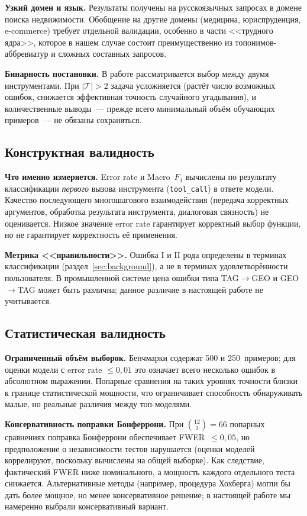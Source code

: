 \textbf{Узкий домен и язык.} Результаты получены на русскоязычных запросах в домене поиска недвижимости. Обобщение на другие домены (медицина, юриспруденция, e-commerce) требует отдельной валидации, особенно в части <<трудного ядра>>, которое в нашем случае состоит преимущественно из топонимов-аббревиатур и сложных составных запросов.

\textbf{Бинарность постановки.} В работе рассматривается выбор между двумя инструментами. При $|\mathcal{T}| > 2$ задача усложняется (растёт число возможных ошибок, снижается эффективная точность случайного угадывания), и количественные выводы~--- прежде всего минимальный объём обучающих примеров~--- не обязаны сохраняться.

\subsection{Конструктная валидность}

\textbf{Что именно измеряется.} Error rate и Macro~$F_1$ вычислены по результату классификации \emph{первого} вызова инструмента (\texttt{tool\_call}) в ответе модели. Качество последующего многошагового взаимодействия (передача корректных аргументов, обработка результата инструмента, диалоговая связность) не оценивается. Низкое значение error rate гарантирует корректный выбор функции, но не гарантирует корректность её применения.

\textbf{Метрика <<правильности>>.} Ошибка I и II рода определены в терминах классификации (раздел~\ref{sec:background}), а не в терминах удовлетворённости пользователя. В промышленной системе цена ошибки типа TAG$\to$GEO и GEO$\to$TAG может быть различна; данное различие в настоящей работе не учитывается.

\subsection{Статистическая валидность}

\textbf{Ограниченный объём выборок.} Бенчмарки содержат 500 и 250~примеров; для оценки модели с error rate $\leqslant 0{,}01$ это означает всего несколько ошибок в абсолютном выражении. Попарные сравнения на таких уровнях точности близки к границе статистической мощности, что ограничивает способность обнаруживать малые, но реальные различия между топ-моделями.

\textbf{Консервативность поправки Бонферрони.} При $\binom{12}{2} = 66$ попарных сравнениях поправка Бонферрони обеспечивает FWER~$\leqslant 0{,}05$, но предположение о независимости тестов нарушается (оценки моделей коррелируют, поскольку вычислены на общей выборке). Как следствие, фактический FWER ниже номинального, а мощность каждого отдельного теста снижается. Альтернативные методы (например, процедура Хохберга) могли бы дать более мощное, но менее консервативное решение; в настоящей работе мы намеренно выбрали консервативный вариант.


